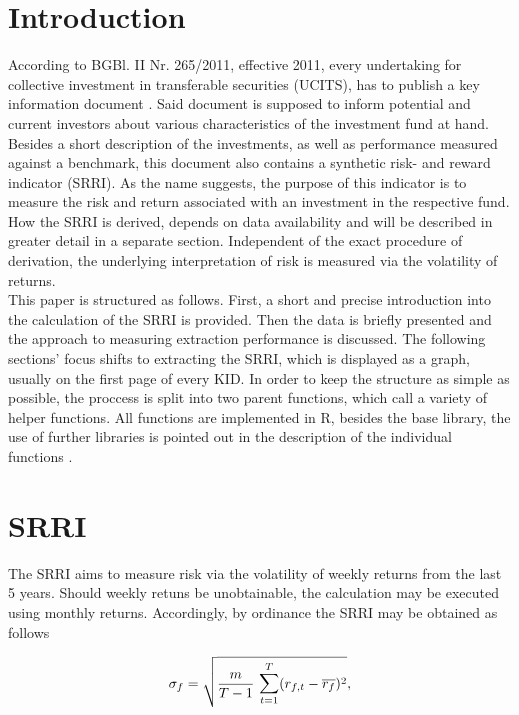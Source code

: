 \documentclass[aodsor,preprint]{imsart}
\numberwithin{equation}{section}
\theoremstyle{plain}
\begin{document}
\section{Introduction}
According to BGBl. II Nr. 265/2011, effective 2011, every undertaking for collective investment in transferable securities (UCITS), has to publish a key information document \citep{BGB1}. Said document is supposed to inform potential and current investors about various characteristics of the investment fund at hand. Besides a short description of the investments, as well as performance measured against a benchmark, this document also contains a synthetic risk- and reward indicator (SRRI). As the name suggests, the purpose of this indicator is to measure the risk and return associated with an investment in the respective fund. How the SRRI is derived, depends on data availability and will be described in greater detail in a separate section. Independent of the exact procedure of derivation, the underlying interpretation of risk is measured via the volatility of returns.\\
This paper is structured as follows. First, a short and precise introduction into the calculation of the SRRI is provided. Then the data is briefly presented and the approach to measuring extraction performance is discussed. The following sections' focus shifts to extracting the SRRI, which is displayed as a graph, usually on the first page of every KID. In order to keep the structure as simple as possible, the proccess is split into two parent functions, which call a variety of helper functions. All functions are implemented in R, besides the base library, the use of further libraries is pointed out in the description of the individual functions \citep{base}.

\newpage

\section{SRRI}

The SRRI aims to measure risk via the volatility of weekly returns from the last 5 years. Should weekly retuns be unobtainable, the calculation may be executed using monthly returns. Accordingly, by ordinance the SRRI may be obtained as follows

\[
\sigma_f = \sqrt{\frac{m}{T - 1}\text{ }\mathlarger{\sum}_{t = 1}^{T} (r_{f, t} - \overline{r_f})^2},
\]
\end{document}
